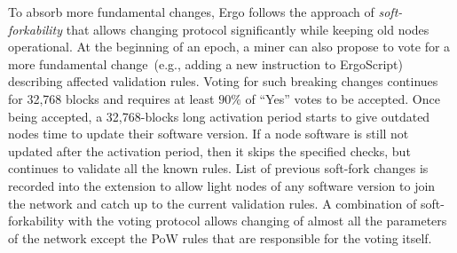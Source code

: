 To absorb more fundamental changes, Ergo follows the approach of {\em soft-forkability} that
allows changing protocol significantly while keeping old nodes operational.
At the beginning of an epoch, a miner can also propose to vote for a more fundamental change~(e.g., adding a new instruction to ErgoScript) describing affected validation rules.
Voting for such breaking changes continues for 32,768 blocks and requires at least $90\%$ of
``Yes'' votes to be accepted. Once being accepted, a 32,768-blocks long activation period starts to give outdated nodes time to update their software version.
If a node software is still not updated after the activation period, then it skips the specified checks, but continues to validate all the known rules.
List of previous soft-fork changes is recorded into the extension to allow light nodes of
any software version to join the network and catch up to the current validation rules.
A combination of soft-forkability with the voting protocol allows changing of almost all the parameters of the network except the PoW rules that are responsible for the voting itself.
